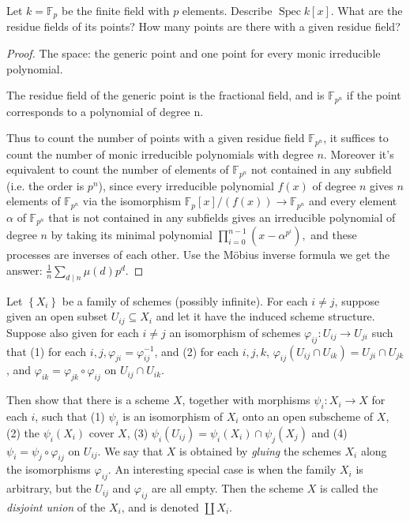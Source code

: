 \begin{exe}
	\label{2.2.11}
	Let $k=\mathbb{F}_{p}$ be the finite field with $p$ elements. Describe $\operatorname{Spec} k[x]$. What are the residue fields of its points? How many points are there with a given residue field?
\end{exe}
\begin{proof}
	
	The space: the generic point and one point for every monic irreducible polynomial.  
	
	The residue field of the generic point is the fractional field,  and is 
	$\mathbb{F}_{p^{n}}$ if the point corresponds to a polynomial of degree n.  
	
	Thus to count the number of points with a given residue field $\mathbb{F}_{p^{n}}$,  it suffices to count the number of monic irreducible polynomials with degree $n$.   Moreover it's equivalent to count the number of elements of $\mathbb{F}_{p^{n}}$ not contained in any subfield (i.e.  the order is $p^{n}$),  since every irreducible polynomial $f(x)$ of degree $n$ gives $n$ elements of $\mathbb{F}_{p^{n}}$ via the isomorphism $\mathbb{F}_{p}[x] /(f(x)) \rightarrow \mathbb{F}_{p^{n}}$ and every element $\alpha$ of $\mathbb{F}_{p^{n}}$ that is not contained in any subfields gives an irreducible polynomial of degree $n$ by taking its minimal polynomial $\prod_{i=0}^{n-1}\left(x-\alpha^{p^{i}}\right), $ and these processes are inverses of each other.  Use the Möbius inverse formula we get the answer: $\frac{1}{n}\sum_{d \mid n} \mu(d) p^{d}$.
\end{proof}
\begin{exe}
	\label{2.2.12}
	Let $\left\{X_{i}\right\}$ be a family of schemes (possibly infinite). For each $i \neq j$, suppose given an open subset $U_{i j} \subseteq X_{i}$ and let it have the induced scheme structure. Suppose also given for each $i \neq j$ an isomorphism of schemes $\varphi_{i j}: U_{i j} \rightarrow U_{j i}$ such that (1) for each $i, j, \varphi_{j i}=\varphi_{i j}^{-1}$, and (2) for each $i, j, k$, $\varphi_{i j}\left(U_{i j} \cap U_{i k}\right)=U_{j i} \cap U_{j k}$, and $\varphi_{i k}=\varphi_{j k}\circ \varphi_{i j}$ on $U_{i j} \cap U_{i k}$.
	
	Then show that there is a scheme $X$, together with morphisms $\psi_{i}: X_{i} \rightarrow X$ for each $i$, such that (1) $\psi_{i}$ is an isomorphism of $X_{i}$ onto an open subscheme of $X$, (2) the $\psi_{i}\left(X_{i}\right)$ cover $X$, (3) $\psi_{i}\left(U_{i j}\right)=\psi_{i}\left(X_{i}\right) \cap \psi_{j}\left(X_{j}\right)$ and (4) $\psi_{i}=\psi_{j} \circ \varphi_{i j}$ on $U_{i j}$. We say that $X$ is obtained by \emph{gluing} the schemes $X_i$ along the isomorphisms $\varphi_{ij}$. An interesting special case is when the family $X_i$ is arbitrary, but the $U_{ij}$ and $\varphi_{ij}$ are all empty. Then the scheme $X$ is called the \emph{disjoint union} of the $X_i$, and is denoted $\coprod X_i$.
\end{exe}
